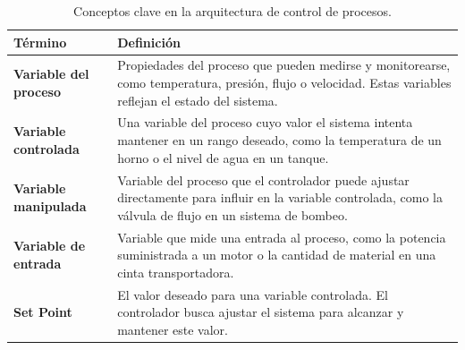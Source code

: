 \begin{table}[h!]

\caption{Conceptos clave en la arquitectura de control de procesos.}
\label{tab:conceptosArq}
\setlength{\extrarowheight}{5pt} %
\renewcommand{\arraystretch}{1.0} %
\begin{tabular}{|>{\raggedright\arraybackslash}p{4.5cm}|>{\raggedright\arraybackslash}p{10.5cm}|}
\hline
\textbf{Término}               & \textbf{Definición}                                                                                                                                       \\ \hline
\textbf{Variable del proceso}  & Propiedades del proceso que pueden medirse y monitorearse, como temperatura, presión, flujo o velocidad. Estas variables reflejan el estado del sistema. \\ \hline
\textbf{Variable controlada}   & Una variable del proceso cuyo valor el sistema intenta mantener en un rango deseado, como la temperatura de un horno o el nivel de agua en un tanque.    \\ \hline
\textbf{Variable manipulada}   & Variable del proceso que el controlador puede ajustar directamente para influir en la variable controlada, como la válvula de flujo en un sistema de bombeo. \\ \hline
\textbf{Variable de entrada}   & Variable que mide una entrada al proceso, como la potencia suministrada a un motor o la cantidad de material en una cinta transportadora.               \\ \hline
\textbf{Set Point}             & El valor deseado para una variable controlada. El controlador busca ajustar el sistema para alcanzar y mantener este valor.                              \\ \hline

\end{tabular}
\end{table}



